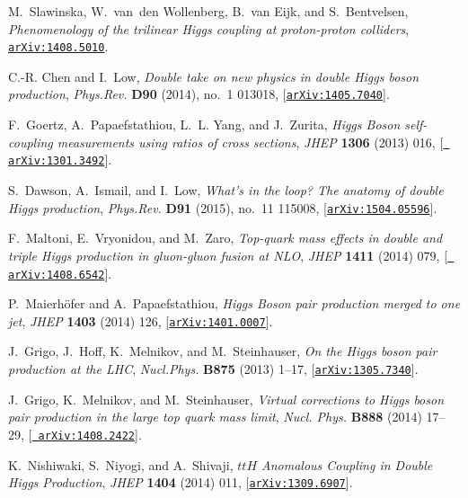 \documentclass[a4paper,11pt]{article}
\begin{document}
\begin{thebibliography}{100}
M.~Slawinska, W.~van~den Wollenberg, B.~van Eijk, and S.~Bentvelsen, {\it
  {Phenomenology of the trilinear Higgs coupling at proton-proton colliders}},
  \href{http://arxiv.org/abs/1408.5010}{{\tt arXiv:1408.5010}}.

C.-R. Chen and I.~Low, {\it {Double take on new physics in double Higgs boson
  production}},  {\em Phys.Rev.} {\bf D90} (2014), no.~1 013018,
  [\href{http://arxiv.org/abs/1405.7040}{{\tt arXiv:1405.7040}}].

F.~Goertz, A.~Papaefstathiou, L.~L. Yang, and J.~Zurita, {\it {Higgs Boson
  self-coupling measurements using ratios of cross sections}},  {\em JHEP} {\bf
  1306} (2013) 016, [\href{http://arxiv.org/abs/1301.3492}{{\tt
  arXiv:1301.3492}}].

S.~Dawson, A.~Ismail, and I.~Low, {\it {What’s in the loop? The anatomy of
  double Higgs production}},  {\em Phys.Rev.} {\bf D91} (2015), no.~11 115008,
  [\href{http://arxiv.org/abs/1504.05596}{{\tt arXiv:1504.05596}}].

F.~Maltoni, E.~Vryonidou, and M.~Zaro, {\it {Top-quark mass effects in double
  and triple Higgs production in gluon-gluon fusion at NLO}},  {\em JHEP} {\bf
  1411} (2014) 079, [\href{http://arxiv.org/abs/1408.6542}{{\tt
  arXiv:1408.6542}}].

P.~Maierhöfer and A.~Papaefstathiou, {\it {Higgs Boson pair production merged
  to one jet}},  {\em JHEP} {\bf 1403} (2014) 126,
  [\href{http://arxiv.org/abs/1401.0007}{{\tt arXiv:1401.0007}}].

J.~Grigo, J.~Hoff, K.~Melnikov, and M.~Steinhauser, {\it {On the Higgs boson
  pair production at the LHC}},  {\em Nucl.Phys.} {\bf B875} (2013) 1--17,
  [\href{http://arxiv.org/abs/1305.7340}{{\tt arXiv:1305.7340}}].

J.~Grigo, K.~Melnikov, and M.~Steinhauser, {\it {Virtual corrections to Higgs
  boson pair production in the large top quark mass limit}},  {\em Nucl. Phys.}
  {\bf B888} (2014) 17--29, [\href{http://arxiv.org/abs/1408.2422}{{\tt
  arXiv:1408.2422}}].

K.~Nishiwaki, S.~Niyogi, and A.~Shivaji, {\it {$ttH$ Anomalous Coupling in
  Double Higgs Production}},  {\em JHEP} {\bf 1404} (2014) 011,
  [\href{http://arxiv.org/abs/1309.6907}{{\tt arXiv:1309.6907}}].


\end{thebibliography}
\end{document}

